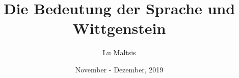 \documentclass[a4paper,12pt]{article}
\begin{document}
\title{\Large{\textbf{Die Bedeutung der Sprache und Wittgenstein}}}
\author{Lu Maltsis}
\date{November - Dezember, 2019}
\maketitle

\blindtext[5]
\end{document}
